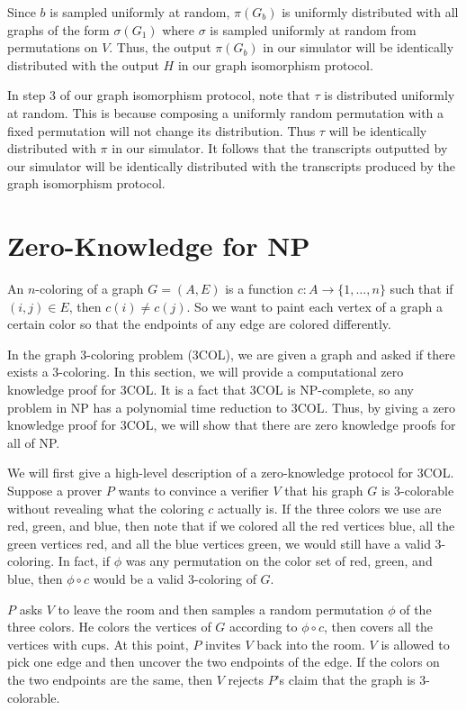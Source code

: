 Since $b$ is sampled uniformly at random, $\pi (G_b)$ is uniformly distributed with all graphs of the form $\sigma (G_1)$ where $\sigma$ is sampled uniformly at random from permutations on $V$. Thus, the output $\pi(G_b)$ in our simulator will be identically distributed with the output $H$ in our graph isomorphism protocol.

In step 3 of our graph isomorphism protocol, note that $\tau$ is distributed uniformly at random. This is because composing a uniformly random permutation with a fixed permutation will not change its distribution. Thus $\tau$ will be identically distributed with $\pi$ in our simulator. It follows that the transcripts outputted by our simulator will be identically distributed with the transcripts produced by the graph isomorphism protocol.

\section{Zero-Knowledge for NP}

An $n$-coloring of a graph $G = (A, E)$ is a function $c: A \to \{1, \ldots, n \}$ such that if $(i, j) \in E$, then $c(i) \neq c(j)$. So we want to paint each vertex of a graph a certain color so that the endpoints of any edge are colored differently.

In the graph 3-coloring problem (3COL), we are given a graph and asked if there exists a 3-coloring. In this section, we will provide a computational zero knowledge proof for 3COL. It is a fact that 3COL is NP-complete, so any problem in NP has a polynomial time reduction to 3COL. Thus, by giving a zero knowledge proof for 3COL, we will show that there are zero knowledge proofs for all of NP.

We will first give a high-level description of a zero-knowledge protocol for 3COL. Suppose a prover $P$ wants to convince a verifier $V$ that his graph $G$ is 3-colorable without revealing what the coloring $c$ actually is. If the three colors we use are red, green, and blue, then note that if we colored all the red vertices blue, all the green vertices red, and all the blue vertices green, we would still have a valid 3-coloring. In fact, if $\phi$ was any permutation on the color set of red, green, and blue, then $\phi \circ c$ would be a valid 3-coloring of $G$.

$P$ asks $V$ to leave the room and then samples a random permutation $\phi$ of the three colors. He colors the vertices of $G$ according to $\phi \circ c$, then covers all the vertices with cups. At this point, $P$ invites $V$ back into the room. $V$ is allowed to pick one edge and then uncover the two endpoints of the edge. If the colors on the two endpoints are the same, then $V$ rejects $P$'s claim that the graph is 3-colorable.

